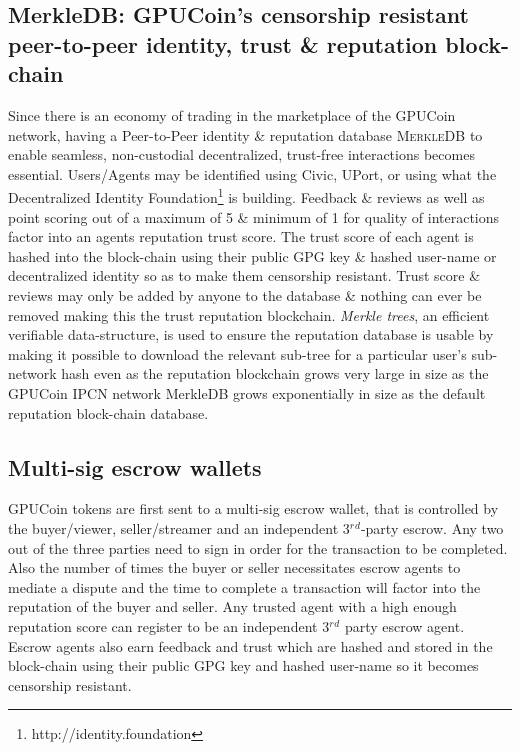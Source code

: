 \documentclass{article}
\begin{document}
\subsection{MerkleDB: GPUCoin's censorship resistant peer-to-peer identity, trust \& reputation block-chain}
Since there is an economy of trading in the marketplace of the GPUCoin network, having a Peer-to-Peer identity \& reputation database \textsc{MerkleDB} to enable seamless, non-custodial decentralized, trust-free interactions becomes essential. Users/Agents may be identified using Civic, UPort, or using what the Decentralized Identity Foundation\footnote{http://identity.foundation} is building. Feedback \& reviews as well as point scoring out of a maximum of 5 \& minimum of 1 for quality of interactions factor into an agents reputation trust score. The trust score of each agent is hashed into the block-chain using their public GPG key \& hashed user-name or decentralized identity so as to make them censorship resistant. Trust score \& reviews may only be added by anyone to the database \& nothing can ever be removed making this the trust reputation blockchain. \emph{Merkle trees}, an efficient verifiable data-structure, is used to ensure the reputation database is usable by making it possible to download the relevant sub-tree for a particular user's sub-network hash even as the reputation blockchain grows very large in size as the GPUCoin IPCN network MerkleDB grows exponentially in size as the default reputation block-chain database.


\subsection{Multi-sig escrow wallets}
GPUCoin tokens are first sent to a multi-sig escrow wallet, that is controlled by the buyer/viewer, seller/streamer and an independent 3$^r$$^d$-party escrow. Any two out of the three parties need to sign in order for the transaction to be completed. Also the number of times the buyer or seller necessitates escrow agents to mediate a dispute and the time to complete a transaction will factor into the reputation of the buyer and seller. Any trusted agent with a high enough reputation score can register to be an independent 3$^r$$^d$ party escrow agent. Escrow agents also earn feedback and trust which are hashed and stored in the block-chain using their public GPG key and hashed user-name so it becomes censorship resistant.
\end{document}
